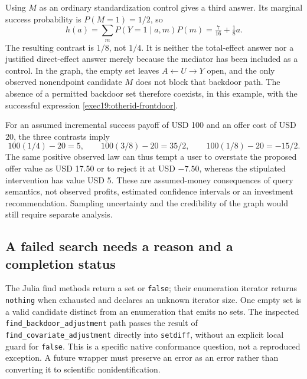 Using $M$ as an ordinary standardization control gives a third answer. Its
marginal success probability is $P(M=1)=1/2$, so
\begin{equation}
 h(a)=\sum_m P(Y=1\mid a,m)P(m)=\tfrac7{16}+\tfrac18a.
 \label{exec19:otherid-standardization}
\end{equation}
The resulting contrast is $1/8$, not $1/4$. It is neither the total-effect
answer nor a justified direct-effect answer merely because the mediator has
been included as a control. In the graph, the empty set leaves
$A\leftarrow U\to Y$ open, and the only observed nonendpoint candidate $M$
does not block that backdoor path. The absence of a permitted backdoor set
therefore coexists, in this example, with the successful expression
\eqref{exec19:otherid-frontdoor}.~\citep{exec19_otherid_reference}

For an assumed incremental success payoff of USD 100 and an offer cost of
USD 20, the three contrasts imply
\begin{equation}
 100(1/4)-20=5,\qquad
 100(3/8)-20=35/2,\qquad
 100(1/8)-20=-15/2.
 \label{exec19:otherid-money}
\end{equation}
The same positive observed law can thus tempt a user to overstate the proposed
offer value as USD 17.50 or to reject it at USD $-7.50$, whereas the stipulated
intervention has value USD 5. These are assumed-money consequences of query
semantics, not observed profits, estimated confidence intervals or an investment
recommendation. Sampling uncertainty and the credibility of the graph would
still require separate analysis.~\citep{exec19_otherid_reference}

\subsection{A failed search needs a reason and a completion status}
\label{exec19:otherid-status}
The Julia find methods return a set or \texttt{false}; their enumeration
iterator returns \texttt{nothing} when exhausted and declares an unknown
iterator size. One empty set is a valid candidate distinct from an enumeration
that emits no sets. The inspected \texttt{find\_backdoor\_adjustment} path
passes the result of \texttt{find\_covariate\_adjustment} directly into
\texttt{setdiff}, without an explicit local guard for \texttt{false}. This
is a specific native conformance question, not a reproduced exception. A
future wrapper must preserve an error as an error rather than converting it
to scientific nonidentification.~\citep{exec19_otherid_julia}

